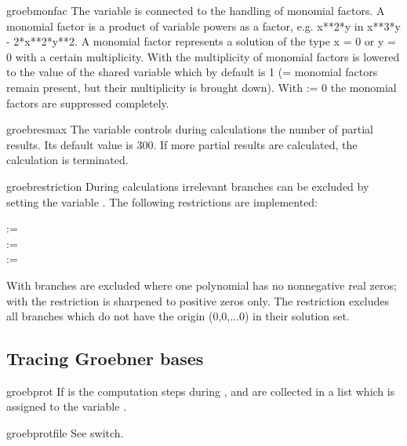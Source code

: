 
\begin{Variable}{groebmonfac}
The variable  is connected to
the handling of monomial factors.  A monomial factor is a product
of variable powers as a factor, e.g. x**2*y  in  x**3*y -
2*x**2*y**2.  A monomial factor represents a solution of the type
 x = 0  or  y = 0 with a certain multiplicity.  With
 the multiplicity of monomial factors is lowered 
to the value of the shared variable 
which by default is 1 (= monomial factors remain present, but their
multiplicity is brought down). With
:= 0
the monomial factors are suppressed completely.
\end{Variable}

\begin{Variable}{groebresmax}
The variable 
controls  during  calculations
the number of partial results. Its default value is 300. If
more partial results are calculated, the calculation is
terminated.
\end{Variable}

\begin{Variable}{groebrestriction}
During  calculations 
irrelevant branches can be excluded
by setting the variable . The
following restrictions are implemented:
\begin{Syntax} 
      :=  \\
      := \\
      := 
\end{Syntax}
With  branches are excluded where one
polynomial has no nonnegative real zeros; with 
the restriction is sharpened to positive zeros only.
The restriction  excludes all branches
which do not have the origin (0,0,...0) in their solution
set.
\end{Variable}

\subsection{Tracing Groebner bases}
\begin{Switch}{groebprot}
If  is  the computation steps during
,  and 
are collected in a list which is assigned to the variable
.
\end{Switch}
\begin{Variable}{groebprotfile}
See  switch.
\end{Variable}

